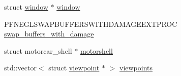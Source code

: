 \begin{DoxyCompactItemize}
\begin{tabbing}
\end{tabbing}\item 
struct \hyperlink{structwindow}{window} $\ast$ \hyperlink{structdisplay_a9974d560bec291487ae2440f897ffc58}{window}
\item 
P\-F\-N\-E\-G\-L\-S\-W\-A\-P\-B\-U\-F\-F\-E\-R\-S\-W\-I\-T\-H\-D\-A\-M\-A\-G\-E\-E\-X\-T\-P\-R\-O\-C \hyperlink{structdisplay_a48c46c118e4765ef06596f6341c8f23f}{swap\-\_\-buffers\-\_\-with\-\_\-damage}
\item 
struct motorcar\-\_\-shell $\ast$ \hyperlink{structdisplay_a0ad2d912a47f21acc312105e1458df68}{motorshell}
\item 
std\-::vector$<$ struct \hyperlink{structviewpoint}{viewpoint} $\ast$ $>$ \hyperlink{structdisplay_ab06917115c7908ddb72c42162d234b72}{viewpoints}
\end{DoxyCompactItemize}


